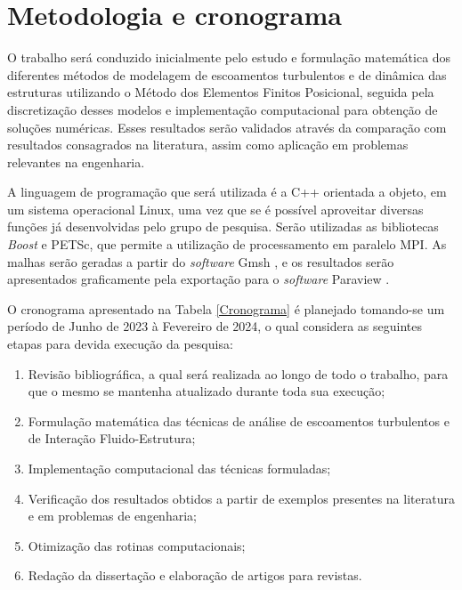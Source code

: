 \chapter{Metodologia e cronograma} \label{MetodologiaCronograma}

O trabalho será conduzido inicialmente pelo estudo e formulação matemática dos diferentes métodos de modelagem de escoamentos turbulentos e de dinâmica das estruturas utilizando o Método dos Elementos Finitos Posicional, seguida pela discretização desses modelos e implementação computacional para obtenção de soluções numéricas. Esses resultados serão validados através da comparação com resultados consagrados na literatura, assim como aplicação em problemas relevantes na engenharia.

A linguagem de programação que será utilizada é a C++ orientada a objeto, em um sistema operacional Linux, uma vez que se é possível aproveitar diversas funções já desenvolvidas pelo grupo de pesquisa. Serão utilizadas as bibliotecas \textit{Boost} e PETSc, que permite a utilização de processamento em paralelo MPI. As malhas serão geradas a partir do \textit{software} Gmsh \cite{geuzaine2009gmsh}, e os resultados serão apresentados graficamente pela exportação para o \textit{software} Paraview \cite{ahrens2005paraview}.

O cronograma apresentado na Tabela \ref{Cronograma} é planejado tomando-se um período de Junho de 2023 à Fevereiro de 2024, o qual considera as seguintes etapas para devida execução da pesquisa:

\begin{enumerate}[label=\alph*.]
	\item\label{M:2} Revisão bibliográfica, a qual será realizada ao longo de todo o trabalho, para que o mesmo se mantenha atualizado durante toda sua execução;
	\item\label{M:3} Formulação matemática das técnicas de análise de escoamentos turbulentos e de Interação Fluido-Estrutura;
	\item\label{M:5} Implementação computacional das técnicas formuladas;
	\item\label{M:6} Verificação dos resultados obtidos a partir de exemplos presentes na literatura e em problemas de engenharia;
	\item\label{M:7} Otimização das rotinas computacionais;
	\item\label{M:8} Redação da dissertação e elaboração de artigos para revistas.
\end{enumerate}

